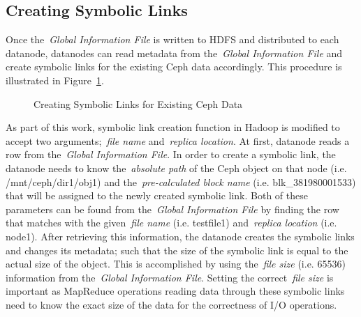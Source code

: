 \documentclass[preprint,12pt]{elsarticle}
\begin{document}
\subsection{Creating Symbolic Links}
\label{symlinks}
Once the~\textit{Global Information File} is written to HDFS and distributed to each datanode,
datanodes can read metadata from the~\textit{Global Information File} and create symbolic
links for the existing Ceph data accordingly. This procedure is illustrated in Figure~\ref{symbolic_lins}.

\begin{figure}[!htbp]
\centering
{}
\caption{Creating Symbolic Links for Existing Ceph Data}
\label{symbolic_lins}
\end{figure}

As part of this work, symbolic link creation function in Hadoop is modified to accept two arguments;~\textit{file name}
and~\textit{replica location}. At first, datanode reads a row from the~\textit{Global Information File}. In order to create a
symbolic link, the datanode needs to know the~\textit{absolute path} of the Ceph object on that node (i.e. /mnt/ceph/dir1/obj1)
and the~\textit{pre-calculated block name} (i.e. blk\_381980001533) that will be assigned to the newly created symbolic link.
Both of these parameters can be found from the~\textit{Global Information File} by finding the row that
matches with the given~\textit{file name} (i.e. testfile1) and~\textit{replica location} (i.e. node1). After retrieving this information,
the datanode creates the symbolic links and changes its metadata; such that the size of the symbolic link
is equal to the actual size of the object. This is accomplished by using the~\textit{file size} (i.e. 65536) information
from the~\textit{Global Information File}. Setting the correct~\textit{file size} is important as MapReduce
operations reading data through these symbolic links need to know the exact size of the data for the correctness
of I/O operations.
\end{document}
